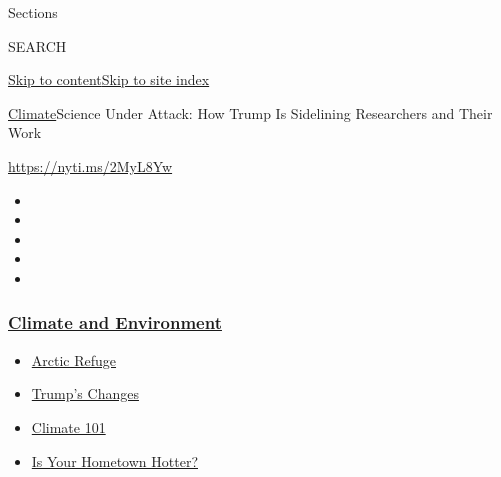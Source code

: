 Sections

SEARCH

\protect\hyperlink{site-content}{Skip to
content}\protect\hyperlink{site-index}{Skip to site index}

\href{/section/climate}{Climate}\textbar{}Science Under Attack: How
Trump Is Sidelining Researchers and Their Work

\url{https://nyti.ms/2MyL8Yw}

\begin{itemize}
\item
\item
\item
\item
\item
\end{itemize}

\hypertarget{climate-and-environment}{%
\subsubsection{\texorpdfstring{\href{https://www.nytimes3xbfgragh.onion/section/climate?name=styln-climate\&region=TOP_BANNER\&variant=undefined\&block=storyline_menu_recirc\&action=click\&pgtype=Article\&impression_id=c6ec2a20-e3a0-11ea-8244-451f6a328e47}{Climate
and
Environment}}{Climate and Environment}}\label{climate-and-environment}}

\begin{itemize}
\tightlist
\item
  \href{https://www.nytimes3xbfgragh.onion/2020/08/17/climate/alaska-oil-drilling-anwr.html?name=styln-climate\&region=TOP_BANNER\&variant=undefined\&block=storyline_menu_recirc\&action=click\&pgtype=Article\&impression_id=c6ec5130-e3a0-11ea-8244-451f6a328e47}{Arctic
  Refuge}
\item
  \href{https://www.nytimes3xbfgragh.onion/interactive/2020/climate/trump-environment-rollbacks.html?name=styln-climate\&region=TOP_BANNER\&variant=undefined\&block=storyline_menu_recirc\&action=click\&pgtype=Article\&impression_id=c6ec5131-e3a0-11ea-8244-451f6a328e47}{Trump's
  Changes}
\item
  \href{https://www.nytimes3xbfgragh.onion/interactive/2020/04/19/climate/climate-crash-course-1.html?name=styln-climate\&region=TOP_BANNER\&variant=undefined\&block=storyline_menu_recirc\&action=click\&pgtype=Article\&impression_id=c6ec5132-e3a0-11ea-8244-451f6a328e47}{Climate
  101}
\item
  \href{https://www.nytimes3xbfgragh.onion/interactive/2018/08/30/climate/how-much-hotter-is-your-hometown.html?name=styln-climate\&region=TOP_BANNER\&variant=undefined\&block=storyline_menu_recirc\&action=click\&pgtype=Article\&impression_id=c6ec5133-e3a0-11ea-8244-451f6a328e47}{Is
  Your Hometown Hotter?}
\end{itemize}


